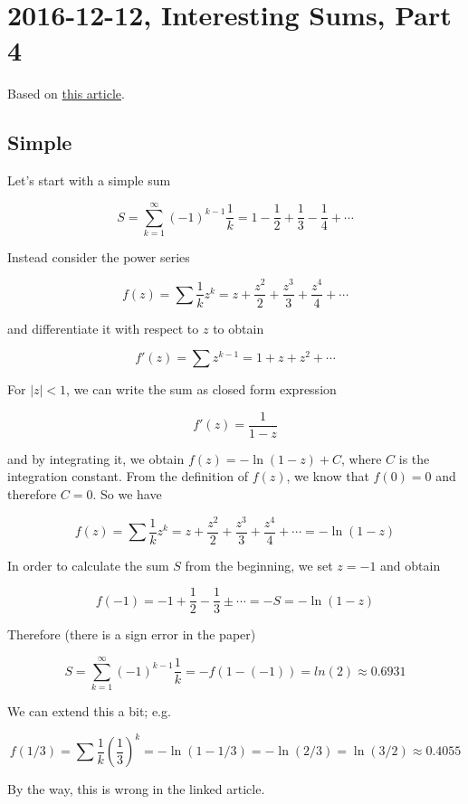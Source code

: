 \section{2016-12-12, Interesting Sums, Part 4}


Based on
\href{http://www.maa.org/programs/maa-awards/writing-awards/lester-r-ford-awards/another-way-to-sum-a-series-generating-functions-euler-and-the-dialog-function}{this
article}.

\subsection{Simple}\label{simple}

Let's start with a simple sum

\[
S = \sum_{k=1}^\infty (-1)^{k-1} \frac{1}{k} = 1 - \frac{1}{2} + \frac{1}{3} - \frac{1}{4} + \cdots
\]

Instead consider the power series

\[
f(z) = \sum \frac{1}{k}z^k = z + \frac{z^2}{2} + \frac{z^3}{3} + \frac{z^4}{4} + \cdots
\]

and differentiate it with respect to \(z\) to obtain

\[
f'(z) = \sum z^{k-1} = 1 + z + z^2 + \cdots
\]

For \(|z| < 1\), we can write the sum as closed form expression

\[
f'(z) = \frac{1}{1-z}
\]

and by integrating it, we obtain \(f(z) = - \ln(1-z) + C\), where \(C\)
is the integration constant. From the definition of \(f(z)\), we know
that \(f(0) = 0\) and therefore \(C = 0\). So we have

\[
f(z) = \sum \frac{1}{k}z^k = z + \frac{z^2}{2} + \frac{z^3}{3} + \frac{z^4}{4} + \cdots = -\ln(1-z)
\]

In order to calculate the sum \(S\) from the beginning, we set \(z=-1\)
and obtain

\[
f(-1) = -1 + \frac{1}{2} - \frac{1}{3} \pm \cdots = - S = -\ln(1-z)
\]

Therefore (there is a sign error in the paper)

\[
S = \sum_{k=1}^\infty (-1)^{k-1} \frac{1}{k} = -f(1-(-1)) = ln(2) \approx 0.6931
\]

We can extend this a bit; e.g.

\[
f(1/3) = \sum \frac{1}{k} \left( \frac{1}{3} \right)^k = -\ln(1-1/3) = -\ln(2/3) = \ln(3/2) \approx 0.4055
\]

By the way, this is wrong in the linked article.

